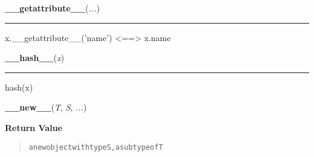     \label{object:__getattribute__}

    \vspace{0.5ex}

    \begin{boxedminipage}{\textwidth}

    \raggedright \textbf{\_\_getattribute\_\_}(\textit{...})

    \vspace{-1.5ex}

    \rule{\textwidth}{0.5\fboxrule}

x.{\_}{\_}getattribute{\_}{\_}('name') {\textless}=={\textgreater} x.name
    \vspace{1ex}

    \end{boxedminipage}

    \label{object:__hash__}

    \vspace{0.5ex}

    \begin{boxedminipage}{\textwidth}

    \raggedright \textbf{\_\_hash\_\_}(\textit{x})

    \vspace{-1.5ex}

    \rule{\textwidth}{0.5\fboxrule}

hash(x)
    \vspace{1ex}

    \end{boxedminipage}

    \label{object:__new__}

    \vspace{0.5ex}

    \begin{boxedminipage}{\textwidth}

    \raggedright \textbf{\_\_new\_\_}(\textit{T}, \textit{S}, \textit{...})

      \textbf{Return Value}
      \begin{quote}
\begin{alltt}
a new object with type S, a subtype of T
\end{alltt}

      \end{quote}

    \vspace{1ex}

    \end{boxedminipage}

